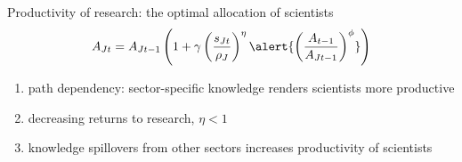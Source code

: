 \documentclass[11pt,aspectratio=169]{beamer}
\begin{document}
\addtocounter{framenumber}{-1}
\begin{frame}{Productivity of research: the optimal allocation of scientists}
	\large
	\begin{align*}
		A_{Jt}={A_{Jt-1}}\left(1+\gamma\left(\frac{s_{Jt}}{\rho_J}\right)^\eta\alert{\left(\frac{A_{t-1}}{A_{Jt-1}}\right)^\phi}\right)
	\end{align*}
	\normalsize
	\begin{enumerate}
		\item path dependency: sector-specific knowledge renders scientists more productive
		\item decreasing returns to research, $\eta<1$
		\item \alert{knowledge spillovers} from other sectors increases productivity of scientists
	\end{enumerate}
\end{frame}
\end{document}
